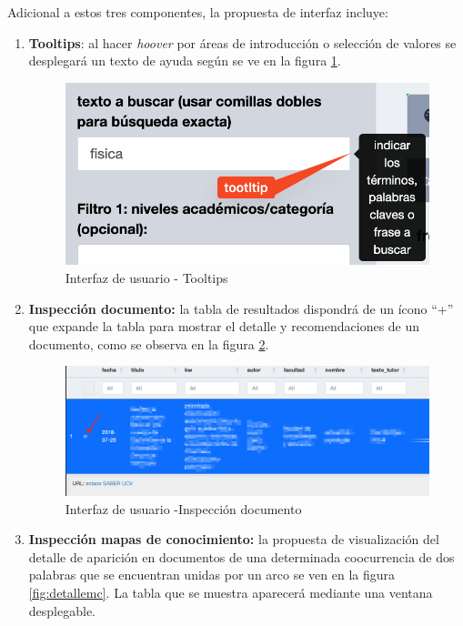 \documentclass[
  12pt,
  openany]{book}
\begin{document}
Adicional a estos tres componentes, la propuesta de interfaz incluye:

\begin{enumerate}
\def\labelenumi{\arabic{enumi}.}
\item
  \textbf{Tooltips}: al hacer \emph{hoover} por áreas de introducción o selección de valores se desplegará un texto de ayuda según se ve en la figura \ref{fig:tooltip}.

  \begin{figure}

  {\centering \includegraphics[width=0.3\linewidth]{images/05-desarrollo/4_ciclo/UI/tooltip} 

  }

  \caption{Interfaz de usuario - Tooltips }\label{fig:tooltip}
  \end{figure}
\item
  \textbf{Inspección documento:} la tabla de resultados dispondrá de un ícono ``+'' que expande la tabla para mostrar el detalle y recomendaciones de un documento, como se observa en la figura \ref{fig:detalledoc}.

  \begin{figure}

  {\centering \includegraphics[width=0.8\linewidth]{images/05-desarrollo/4_ciclo/UI/uiinspecciontabla} 

  }

  \caption{Interfaz de usuario -Inspección documento }\label{fig:detalledoc}
  \end{figure}
\item
  \textbf{Inspección mapas de conocimiento:} la propuesta de visualización del detalle de aparición en documentos de una determinada coocurrencia de dos palabras que se encuentran unidas por un arco se ven en la figura \ref{fig:detallemc}. La tabla que se muestra aparecerá mediante una ventana desplegable.


\end{enumerate}
\end{document}
